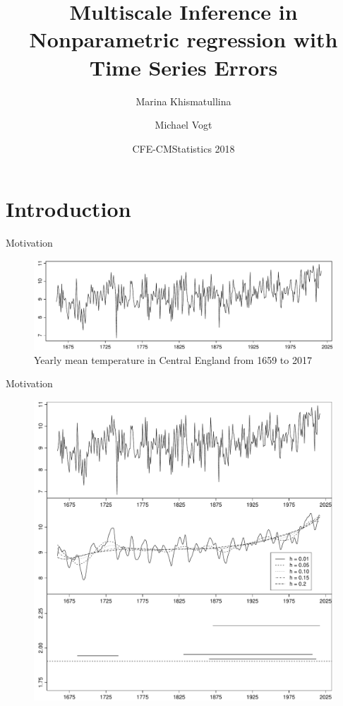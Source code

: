\documentclass[10pt]{beamer}
\title{Multiscale Inference in Nonparametric regression with Time Series Errors}
\date{CFE-CMStatistics 2018}
\author{Marina Khismatullina \inst{1} \and Michael Vogt \inst{1}}
\institute{\inst{1} University of Bonn}
\begin{document}
\maketitle


\section{Introduction}

\begin{frame}{Motivation}
	\begin{figure}
		\centering
		\includegraphics[width=\textwidth]{temperature_data.pdf}
		\caption{Yearly mean temperature in Central England from 1659 to 2017}
		\label{figure:temperature_data}
	\end{figure}
\end{frame}

\begin{frame}{Motivation}
  \begin{figure}
    \centering
    \includegraphics[height=0.85\textheight]{threegraphics_testing_constant_method_ll.pdf}
    \label{figure:shape_results}
  \end{figure}
\end{frame}
\end{document}
